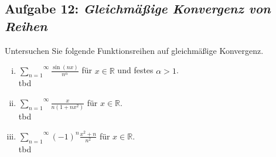 \documentclass[11pt,a4paper,ngerman]{article}
\begin{document}
\subsection*{Aufgabe 12: \mdseries\itshape Gleichmäßige Konvergenz von Reihen}

Untersuchen Sie folgende Funktionsreihen auf gleichmäßige Konvergenz.

\begin{enumerate}[(i)]

    \item $\overset{\infty}{\underset{n=1}{\sum}} \frac{\sin(nx)}{n^\alpha}$ für $x\in\mathbb{R}$ und festes $\alpha > 1$.\\
        tbd

    \item $\overset{\infty}{\underset{n=1}{\sum}} \frac{x}{n(1+nx^2)}$ für $x\in\mathbb{R}$.\\
        tbd

    \item $\overset{\infty}{\underset{n=1}{\sum}} (-1)^n \frac{x^2+n}{n^2}$ für $x\in\mathbb{R}$.\\
        tbd

\end{enumerate}

\label{LastPage}
\end{document}
